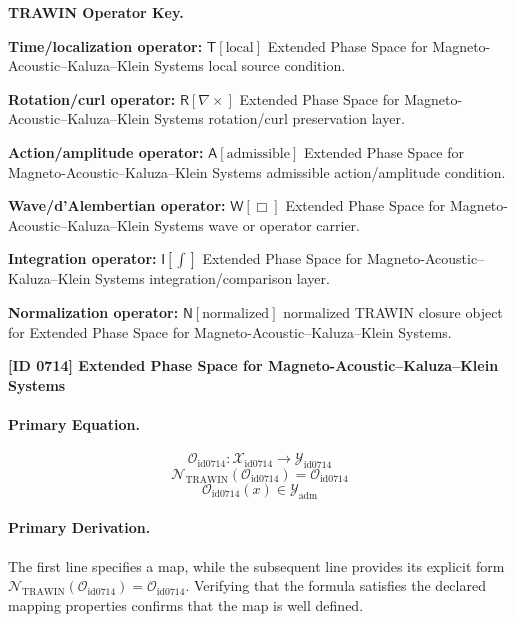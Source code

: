 \par\vspace{0.45\baselineskip}
\noindent\begin{minipage}[t]{\linewidth}
\begingroup
\small
\raggedright
\textbf{TRAWIN Operator Key.}\par
\noindent\textbf{Time/localization operator:} $\mathsf{T}\!\left[\mathrm{local}\right]$ Extended Phase Space for Magneto-Acoustic--Kaluza--Klein Systems local source condition.\par
\noindent\textbf{Rotation/curl operator:} $\mathsf{R}\!\left[\nabla\times\right]$ Extended Phase Space for Magneto-Acoustic--Kaluza--Klein Systems rotation/curl preservation layer.\par
\noindent\textbf{Action/amplitude operator:} $\mathsf{A}\!\left[\mathrm{admissible}\right]$ Extended Phase Space for Magneto-Acoustic--Kaluza--Klein Systems admissible action/amplitude condition.\par
\noindent\textbf{Wave/d'Alembertian operator:} $\mathsf{W}\!\left[\Box\right]$ Extended Phase Space for Magneto-Acoustic--Kaluza--Klein Systems wave or operator carrier.\par
\noindent\textbf{Integration operator:} $\mathsf{I}\!\left[\int\right]$ Extended Phase Space for Magneto-Acoustic--Kaluza--Klein Systems integration/comparison layer.\par
\noindent\textbf{Normalization operator:} $\mathsf{N}\!\left[\mathrm{normalized}\right]$ normalized TRAWIN closure object for Extended Phase Space for Magneto-Acoustic--Kaluza--Klein Systems.\par
\endgroup
\end{minipage}

\clearpage
\noindent\textbf{[ID 0714] Extended Phase Space for Magneto-Acoustic--Kaluza--Klein Systems}\par
\vspace{0.35em}
\paragraph{Primary Equation.}
\[
\mathcal{O}_{\mathrm{id0714}}:\mathcal{X}_{\mathrm{id0714}}\longrightarrow\mathcal{Y}_{\mathrm{id0714}}
\]
\[
\mathcal{N}_{\mathrm{TRAWIN}}(\mathcal{O}_{\mathrm{id0714}})=\mathcal{O}_{\mathrm{id0714}}
\]
\[
\mathcal{O}_{\mathrm{id0714}}(x)\in\mathcal{Y}_{\mathrm{adm}}
\]

\paragraph{Primary Derivation.}
The first line specifies a map, while the subsequent line provides its explicit form \( \mathcal{N}_{\mathrm{TRAWIN}}(\mathcal{O}_{\mathrm{id0714}})=\mathcal{O}_{\mathrm{id0714}} \). Verifying that the formula satisfies the declared mapping properties confirms that the map is well defined.
